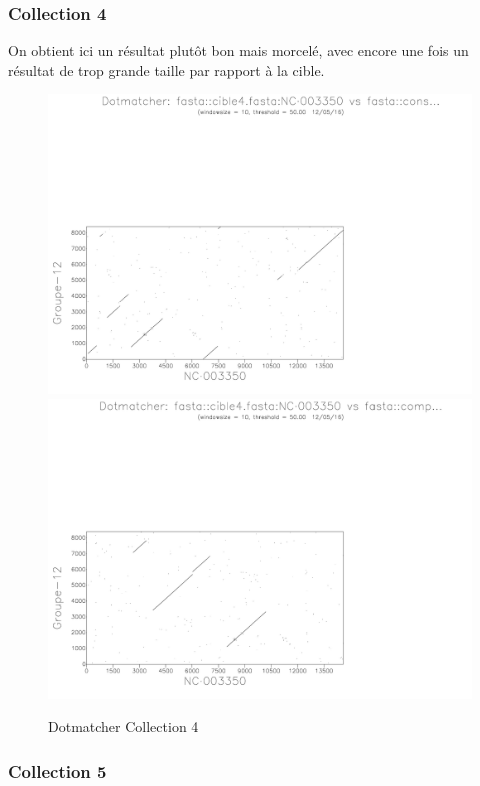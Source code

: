 \documentclass[a4paper]{article}
\begin{document}
\subsubsection{Collection 4}

On obtient ici un résultat plutôt bon mais morcelé, avec encore une
fois un résultat de trop grande taille par rapport à la cible.

\begin{figure}[H]
\includegraphics[scale=0.25]{4}\includegraphics[scale=0.25]{4compl}\caption{Dotmatcher Collection 4}
\end{figure}



\subsubsection{Collection 5}
\end{document}
